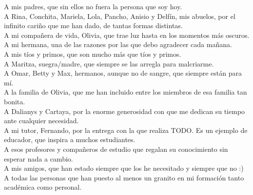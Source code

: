 \begin{acknowledgements}
    A mis padres, que sin ellos no fuera la persona que soy hoy. \\

    A Rina, Conchita, Mariela, Lola, Pancho, Anisio y Delfín, mis abuelos, 
    por el infinito cariño que me han dado, de tantas formas distintas. \\

    A mi compañera de vida, Olivia, que trae luz hasta en los momentos más oscuros. \\

    A mi hermana, una de las razones por las que debo agradecer cada mañana. \\

    A mis tíos y primos, que son mucho más que tíos y primos. \\

    A Maritza, suegra/madre, que siempre se las arregla para malcriarme. \\
    
    A Omar, Betty y Max, hermanos, aunque no de sangre, que siempre están para mí. \\ 

    A la familia de Olivia, que me han incluido entre los miembros de esa familia tan bonita. \\

    A Dalianys y Cartaya, por la enorme generosidad con que me dedican su tiempo ante cualquier 
    necesidad. \\ 

    A mi tutor, Fernando, por la entrega con la que realiza TODO. Es un ejemplo de educador, que 
    inspira a muchos estudiantes. \\ 

    A esos profesores y compañeros de estudio que regalan su conocimiento sin esperar nada a cambio. \\

    A mis amigos, que han estado siempre que los he necesitado y siempre que no :) \\

    A todas las personas que han puesto al menos un granito en mi formación tanto académica como personal.  


\end{acknowledgements}